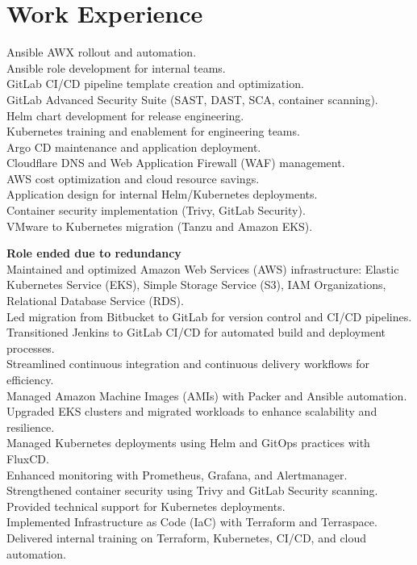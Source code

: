 \documentclass[10pt,a4paper,sans]{moderncv}
\begin{document}
\section{Work Experience}

{
	Ansible AWX rollout and automation.\\
	Ansible role development for internal teams.\\
	GitLab CI/CD pipeline template creation and optimization.\\
	GitLab Advanced Security Suite (SAST, DAST, SCA, container scanning).\\
	Helm chart development for release engineering.\\
	Kubernetes training and enablement for engineering teams.\\
	Argo CD maintenance and application deployment.\\
	Cloudflare DNS and Web Application Firewall (WAF) management.\\
	AWS cost optimization and cloud resource savings.\\
	Application design for internal Helm/Kubernetes deployments.\\
	Container security implementation (Trivy, GitLab Security).\\
	VMware to Kubernetes migration (Tanzu and Amazon EKS).\\
}

{\textbf{Role ended due to redundancy}\\
	Maintained and optimized Amazon Web Services (AWS) infrastructure: Elastic Kubernetes Service (EKS), Simple Storage Service (S3), IAM Organizations, Relational Database Service (RDS).\\
	Led migration from Bitbucket to GitLab for version control and CI/CD pipelines.\\
	Transitioned Jenkins to GitLab CI/CD for automated build and deployment processes.\\
	Streamlined continuous integration and continuous delivery workflows for efficiency.\\
	Managed Amazon Machine Images (AMIs) with Packer and Ansible automation.\\
	Upgraded EKS clusters and migrated workloads to enhance scalability and resilience.\\
	Managed Kubernetes deployments using Helm and GitOps practices with FluxCD.\\
	Enhanced monitoring with Prometheus, Grafana, and Alertmanager.\\
	Strengthened container security using Trivy and GitLab Security scanning.\\
	Provided technical support for Kubernetes deployments.\\
	Implemented Infrastructure as Code (IaC) with Terraform and Terraspace.\\
	Delivered internal training on Terraform, Kubernetes, CI/CD, and cloud automation.\\
}
\end{document}
